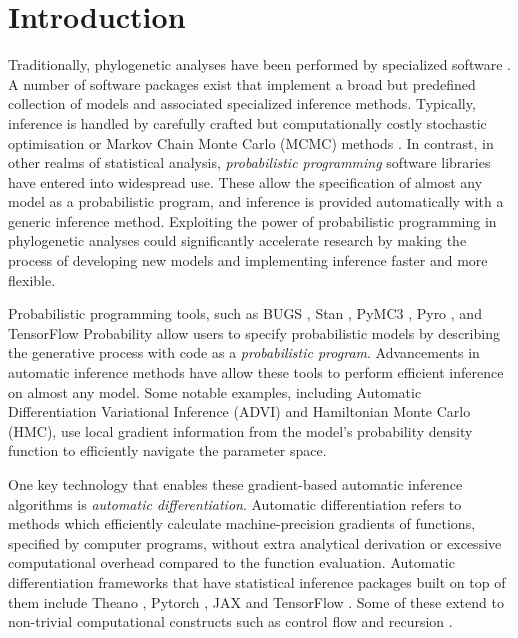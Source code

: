 
\section{Introduction}

Traditionally, phylogenetic analyses have been performed by specialized software \cite{stamatakis2014raxml, drummond2012bayesian, huelsenbeck2001mrbayes}. A number of software packages exist that implement a broad but predefined collection of models and associated specialized inference methods. Typically, inference is handled by carefully crafted but computationally costly stochastic optimisation or Markov Chain Monte Carlo (MCMC) methods \cite{metropolis1953equation, hastings1970monte}. In contrast, in other realms of statistical analysis, \textit{probabilistic programming} software libraries have entered into widespread use. These allow the specification of almost any model as a probabilistic program, and inference is provided automatically with a generic inference method. Exploiting the power of probabilistic programming in phylogenetic analyses could significantly accelerate research by making the process of developing new models and implementing inference faster and more flexible.

Probabilistic programming tools, such as BUGS \cite{lunn2000winbugs}, Stan \cite{carpenter2017stan}, PyMC3 \cite{salvatier2016probabilistic}, Pyro \cite{bingham2019pyro}, and TensorFlow Probability \cite{dillon2017tensorflow} allow users to specify probabilistic models by describing the generative process with code as a \textit{probabilistic program}. Advancements in automatic inference methods have allow these tools to perform efficient inference on almost any model. Some notable examples, including Automatic Differentiation Variational Inference \cite{kucukelbir2017automatic} (ADVI) and Hamiltonian Monte Carlo \cite{duane1987hybrid} (HMC), use local  gradient information from the model's probability density function to efficiently navigate the parameter space.

One key technology that enables these gradient-based automatic inference algorithms is \textit{automatic differentiation}. Automatic differentiation refers to methods which efficiently calculate machine-precision gradients of functions, specified by computer programs, without extra analytical derivation or excessive computational overhead compared to the function evaluation. Automatic differentiation frameworks that have statistical inference packages built on top of them include Theano \cite{bergstra2010theano}, Pytorch \cite{paszke2019pytorch}, JAX \cite{jax2018github} and TensorFlow \cite{abadi2016tensorflow}. Some of these extend to non-trivial computational constructs such as control flow and recursion \cite{yu2018dynamic}.

